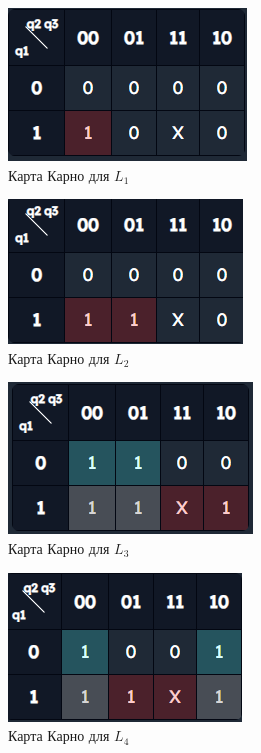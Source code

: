 \documentclass[a4paper, final]{article}
\begin{document}
\begin{figure}[H]
  \centering
  \includegraphics[width=0.5\linewidth]{l1.png}
  \caption{Карта Карно для $L_1$}
  \label{img:l1}
\end{figure}

\begin{figure}[H]
  \centering
  \includegraphics[width=0.5\linewidth]{l2.png}
  \caption{Карта Карно для $L_2$}
  \label{img:l2}
\end{figure}

\begin{figure}[H]
  \centering
  \includegraphics[width=0.5\linewidth]{l3.png}
  \caption{Карта Карно для $L_3$}
  \label{img:l3}
\end{figure}

\begin{figure}[H]
  \centering
  \includegraphics[width=0.5\linewidth]{l4.png}
  \caption{Карта Карно для $L_4$}
  \label{img:l4}
\end{figure}
\end{document}
